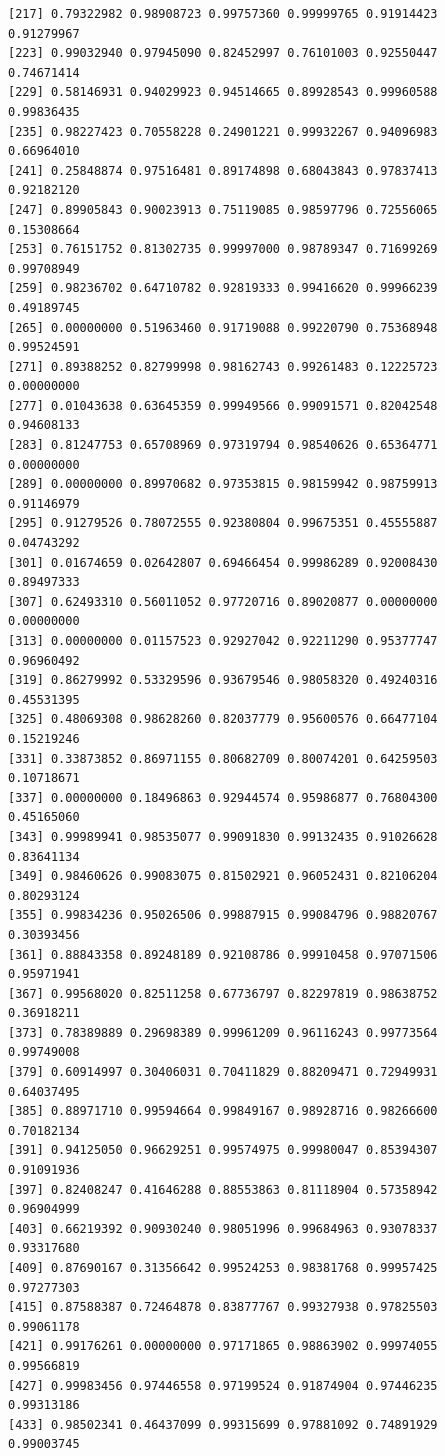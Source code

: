 \documentclass[
  11pt,
  a4paper,
]{report}
\begin{document}
\begin{verbatim}
[217] 0.79322982 0.98908723 0.99757360 0.99999765 0.91914423 0.91279967
[223] 0.99032940 0.97945090 0.82452997 0.76101003 0.92550447 0.74671414
[229] 0.58146931 0.94029923 0.94514665 0.89928543 0.99960588 0.99836435
[235] 0.98227423 0.70558228 0.24901221 0.99932267 0.94096983 0.66964010
[241] 0.25848874 0.97516481 0.89174898 0.68043843 0.97837413 0.92182120
[247] 0.89905843 0.90023913 0.75119085 0.98597796 0.72556065 0.15308664
[253] 0.76151752 0.81302735 0.99997000 0.98789347 0.71699269 0.99708949
[259] 0.98236702 0.64710782 0.92819333 0.99416620 0.99966239 0.49189745
[265] 0.00000000 0.51963460 0.91719088 0.99220790 0.75368948 0.99524591
[271] 0.89388252 0.82799998 0.98162743 0.99261483 0.12225723 0.00000000
[277] 0.01043638 0.63645359 0.99949566 0.99091571 0.82042548 0.94608133
[283] 0.81247753 0.65708969 0.97319794 0.98540626 0.65364771 0.00000000
[289] 0.00000000 0.89970682 0.97353815 0.98159942 0.98759913 0.91146979
[295] 0.91279526 0.78072555 0.92380804 0.99675351 0.45555887 0.04743292
[301] 0.01674659 0.02642807 0.69466454 0.99986289 0.92008430 0.89497333
[307] 0.62493310 0.56011052 0.97720716 0.89020877 0.00000000 0.00000000
[313] 0.00000000 0.01157523 0.92927042 0.92211290 0.95377747 0.96960492
[319] 0.86279992 0.53329596 0.93679546 0.98058320 0.49240316 0.45531395
[325] 0.48069308 0.98628260 0.82037779 0.95600576 0.66477104 0.15219246
[331] 0.33873852 0.86971155 0.80682709 0.80074201 0.64259503 0.10718671
[337] 0.00000000 0.18496863 0.92944574 0.95986877 0.76804300 0.45165060
[343] 0.99989941 0.98535077 0.99091830 0.99132435 0.91026628 0.83641134
[349] 0.98460626 0.99083075 0.81502921 0.96052431 0.82106204 0.80293124
[355] 0.99834236 0.95026506 0.99887915 0.99084796 0.98820767 0.30393456
[361] 0.88843358 0.89248189 0.92108786 0.99910458 0.97071506 0.95971941
[367] 0.99568020 0.82511258 0.67736797 0.82297819 0.98638752 0.36918211
[373] 0.78389889 0.29698389 0.99961209 0.96116243 0.99773564 0.99749008
[379] 0.60914997 0.30406031 0.70411829 0.88209471 0.72949931 0.64037495
[385] 0.88971710 0.99594664 0.99849167 0.98928716 0.98266600 0.70182134
[391] 0.94125050 0.96629251 0.99574975 0.99980047 0.85394307 0.91091936
[397] 0.82408247 0.41646288 0.88553863 0.81118904 0.57358942 0.96904999
[403] 0.66219392 0.90930240 0.98051996 0.99684963 0.93078337 0.93317680
[409] 0.87690167 0.31356642 0.99524253 0.98381768 0.99957425 0.97277303
[415] 0.87588387 0.72464878 0.83877767 0.99327938 0.97825503 0.99061178
[421] 0.99176261 0.00000000 0.97171865 0.98863902 0.99974055 0.99566819
[427] 0.99983456 0.97446558 0.97199524 0.91874904 0.97446235 0.99313186
[433] 0.98502341 0.46437099 0.99315699 0.97881092 0.74891929 0.99003745

\end{verbatim}
\end{document}
